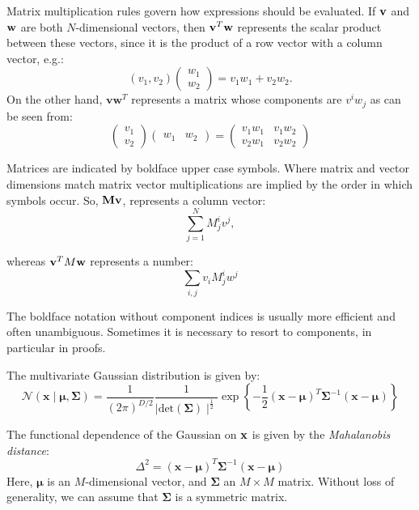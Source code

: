   Matrix multiplication rules govern how expressions should be evaluated. If ${\bf v}$ and ${\bf w}$ are both $N$-dimensional vectors, then
  ${\bf v}^T {\bf w}$ represents the scalar product between these vectors, since it is the product of a row vector with a column vector, e.g.:
  $$
  \left( v_1, v_2 \right) \left( \begin{array}{c} w_1 \\ w_2 \end{array} \right) = v_1 w_1 + v_2 w_2. 
  $$
  On the other hand, $\boldsymbol{v} \boldsymbol{w}^T$ represents a matrix whose components are $v^iw_j$ as can be seen from:
  $$
  \left( \begin{array}{c} v_1 \\ v_2 \end{array} \right) \left( \begin{array}{cc} w_1 & w_2 \end{array} \right) =
  \left( \begin{array}{cc} v_1w_1 & v_1w_2 \\ v_2w_1 & v_2w_2 \end{array} \right)
  $$

  
  Matrices are indicated by boldface upper case symbols. Where matrix and vector dimensions match matrix vector multiplications are implied by the order in which
  symbols occur. So, ${\bf M} {\bf v}$,  represents a column vector:
  $$
  \sum^N_{j=1} M^i_j v^j,
  $$
 
  whereas ${\bf v}^T M {\bf w}$ represents a number:
  $$
  \sum_{i,j} v_i M^i_j w^j
  $$
  

  
  The boldface notation without component indices is usually more efficient and often unambiguous. Sometimes it is necessary to resort to components, in particular in proofs.

  The multivariate Gaussian distribution is given by:
  \begin{equation}
    \mathcal{N}(\boldsymbol{x} \mid  \boldsymbol{\mu}, \boldsymbol{\Sigma} ) = \frac{1}{(2 \pi)^{D/2}} \frac{1}{ \mid \mbox{det}(\boldsymbol{\Sigma}) \mid^{\frac{1}{2}} } \exp \left\{ -\frac{1}{2}(\boldsymbol{x} - \boldsymbol{\mu})^T  \boldsymbol{\Sigma}^{-1}   (\boldsymbol{x} - \boldsymbol{\mu}) \right\} 
  \end{equation}

  The functional dependence of the Gaussian on ${\bf x}$ is given by the \emph{Mahalanobis distance}:
  \begin{equation}
    \Delta^2 = (\boldsymbol{x} - \boldsymbol{\mu})^T \boldsymbol{\Sigma}^{-1}(\boldsymbol{x} - \boldsymbol{\mu})
  \end{equation}
  Here, $\boldsymbol{\mu}$ is an $M$-dimensional vector, and $\boldsymbol{\Sigma}$ an $M \times M$ matrix. Without loss of generality, we can assume that $\boldsymbol{\Sigma}$ is a symmetric matrix.

